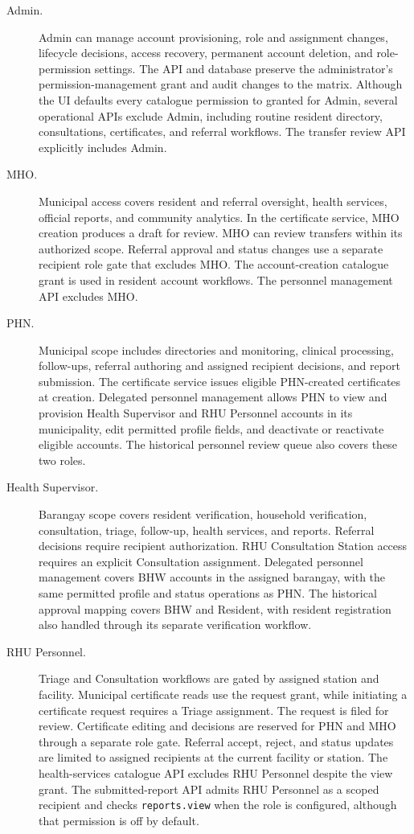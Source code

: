 \begin{description}
\item[Admin.] Admin can manage account provisioning, role and assignment changes, lifecycle decisions, access recovery, permanent account deletion, and role-permission settings. The API and database preserve the administrator's permission-management grant and audit changes to the matrix. Although the UI defaults every catalogue permission to granted for Admin, several operational APIs exclude Admin, including routine resident directory, consultations, certificates, and referral workflows. The transfer review API explicitly includes Admin.
\item[MHO.] Municipal access covers resident and referral oversight, health services, official reports, and community analytics. In the certificate service, MHO creation produces a draft for review. MHO can review transfers within its authorized scope. Referral approval and status changes use a separate recipient role gate that excludes MHO. The account-creation catalogue grant is used in resident account workflows. The personnel management API excludes MHO.
\item[PHN.] Municipal scope includes directories and monitoring, clinical processing, follow-ups, referral authoring and assigned recipient decisions, and report submission. The certificate service issues eligible PHN-created certificates at creation. Delegated personnel management allows PHN to view and provision Health Supervisor and RHU Personnel accounts in its municipality, edit permitted profile fields, and deactivate or reactivate eligible accounts. The historical personnel review queue also covers these two roles.
\item[Health Supervisor.] Barangay scope covers resident verification, household verification, consultation, triage, follow-up, health services, and reports. Referral decisions require recipient authorization. RHU Consultation Station access requires an explicit Consultation assignment. Delegated personnel management covers BHW accounts in the assigned barangay, with the same permitted profile and status operations as PHN. The historical approval mapping covers BHW and Resident, with resident registration also handled through its separate verification workflow.
\item[RHU Personnel.] Triage and Consultation workflows are gated by assigned station and facility. Municipal certificate reads use the request grant, while initiating a certificate request requires a Triage assignment. The request is filed for review. Certificate editing and decisions are reserved for PHN and MHO through a separate role gate. Referral accept, reject, and status updates are limited to assigned recipients at the current facility or station. The health-services catalogue API excludes RHU Personnel despite the view grant. The submitted-report API admits RHU Personnel as a scoped recipient and checks \texttt{reports.view} when the role is configured, although that permission is off by default.

\end{description}
